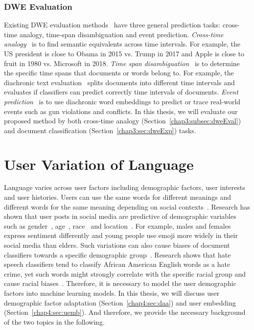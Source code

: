 \subsubsection{DWE Evaluation}

Existing DWE evaluation methods~\cite{kutuzov2018diachronic} have three general prediction tasks: cross-time analogy, time-span disambiguation and event prediction.
\textit{Cross-time analogy}~\cite{szymanski2017temporal, yao2018dynamic} is to find semantic equivalents across time intervals.
For example, the US president is close to Obama in 2015 vs. Trump in 2017 and Apple is close to fruit in 1980 vs. Microsoft in 2018.
\textit{Time span disambiguation}~\cite{mihalcea2012word, popescu2015semeval} is to determine the specific time spans that documents or words belong to. 
For example, the diachronic text evaluation~\cite{popescu2015semeval} splits documents into different time intervals and evaluates if classifiers can predict correctly time intervals of documents.
\textit{Event prediction}~\cite{kutuzov2017tracing} is to use diachronic word embeddings to predict or trace real-world events such as gun violations and conflicts.
In this thesis, we will evaluate our proposed method by both cross-time analogy (Section~\ref{chap3:subsec:dweEval}) and document classification (Section~\ref{chap3:sec:dweExp}) tasks.


\section{User Variation of Language}
\label{chap2:sec:demographic}


Language varies across user factors including demographic factors, user interests and user histories. 
Users can use the same words for different meanings and different words for the same meaning depending on social contexts~\cite{oba2019modeling}. 
Research has shown that user posts in social media are predictive of demographic variables such as 
gender~\cite{rao2010classifying, rao2011hierarchical, burger2011discriminating, volkova2015inferring}, age~\cite{rosenthal2011age, hovy2015tagging, johannsen2015cross, zhang2016predicting, diaz2018addressing}, race~\cite{preoctiuc2018user} and location~\cite{eisenstein2010latent, wing2011simple, wing2014hierarchical}.
For example, males and females express sentiment differently and young people use emoji more widely in their social media than elders.
Such variations can also cause biases of document classifiers towards a specific demographic group~\cite{sun2019mitigating}.
Research shows that hate speech classifiers tend to classify African American English words as a hate crime, yet such words might strongly correlate with the specific racial group and cause racial biases~\cite{davidson2019racial, sap2019risk}.
Therefore, it is necessary to model the user demographic factors into machine learning models.
In this thesis, we will discuss user demographic factor adaptation (Section~\ref{chap4:sec:daa}) and user embedding (Section~\ref{chap4:sec:uemb}).
And therefore, we provide the necessary background of the two topics in the following.


